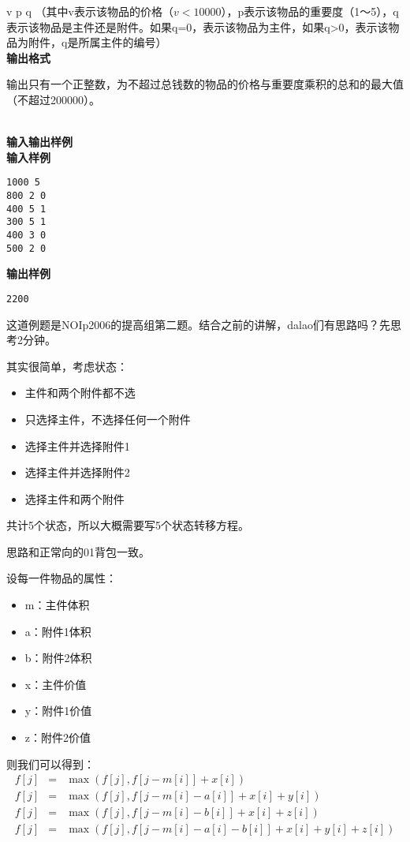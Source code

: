 \begin{example}
	v p q （其中v表示该物品的价格（$v<10000$），p表示该物品的重要度（1～5），q表示该物品是主件还是附件。如果q=0，表示该物品为主件，如果q>0，表示该物品为附件，q是所属主件的编号）\\
	\textbf{输出格式}

	输出只有一个正整数，为不超过总钱数的物品的价格与重要度乘积的总和的最大值（不超过200000）。
	\par
	\ \\
	\textbf{输入输出样例}\\
	\textbf{输入样例}
	\begin{verbatim}
1000 5
800 2 0
400 5 1
300 5 1
400 3 0
500 2 0
\end{verbatim}
	\textbf{输出样例}
	\begin{verbatim}
2200
\end{verbatim}
\end{example}

这道例题是NOIp2006的提高组第二题。结合之前的讲解，dalao们有思路吗？先思考2分钟。

其实很简单，考虑状态：
\begin{itemize}
	\item{主件和两个附件都不选}
	\item{只选择主件，不选择任何一个附件}
	\item{选择主件并选择附件1}
	\item{选择主件并选择附件2}
	\item{选择主件和两个附件}
\end{itemize}

共计5个状态，所以大概需要写5个状态转移方程。

思路和正常向的01背包一致。

设每一件物品的属性：
\begin{itemize}
	\item{m：主件体积}
	\item{a：附件1体积}
	\item{b：附件2体积}
	\item{x：主件价值}
	\item{y：附件1价值}
	\item{z：附件2价值}
\end{itemize}
则我们可以得到：
\begin{eqnarray*}
	f[j]&=&\max(f[j],f[j-m[i]]+x[i])\\
	f[j]&=&\max(f[j],f[j-m[i]-a[i]]+x[i]+y[i])\\
	f[j]&=&\max(f[j],f[j-m[i]-b[i]]+x[i]+z[i])\\
	f[j]&=&\max(f[j],f[j-m[i]-a[i]-b[i]]+x[i]+y[i]+z[i])
\end{eqnarray*}

